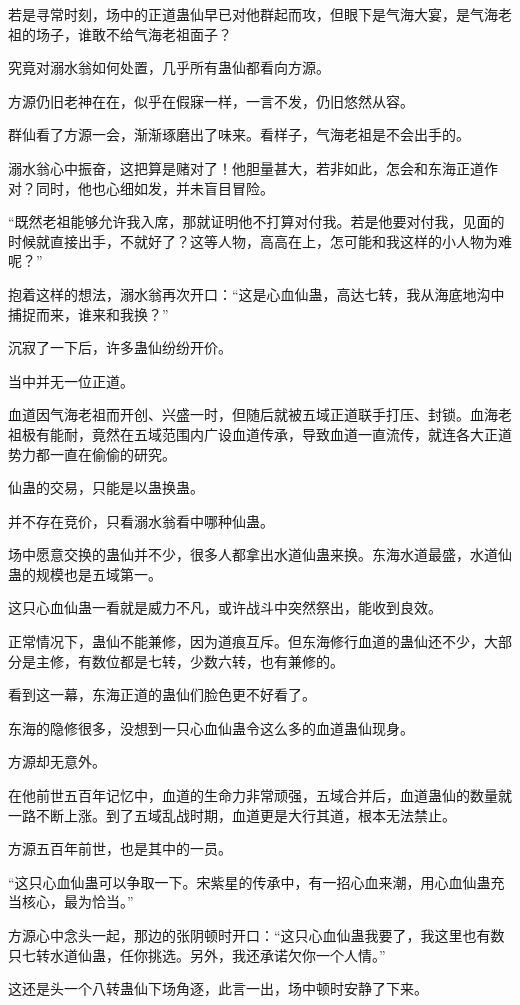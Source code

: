 \begin{this_body}
若是寻常时刻，场中的正道蛊仙早已对他群起而攻，但眼下是气海大宴，是气海老祖的场子，谁敢不给气海老祖面子？

究竟对溺水翁如何处置，几乎所有蛊仙都看向方源。

方源仍旧老神在在，似乎在假寐一样，一言不发，仍旧悠然从容。

群仙看了方源一会，渐渐琢磨出了味来。看样子，气海老祖是不会出手的。

溺水翁心中振奋，这把算是赌对了！他胆量甚大，若非如此，怎会和东海正道作对？同时，他也心细如发，并未盲目冒险。

“既然老祖能够允许我入席，那就证明他不打算对付我。若是他要对付我，见面的时候就直接出手，不就好了？这等人物，高高在上，怎可能和我这样的小人物为难呢？”

抱着这样的想法，溺水翁再次开口：“这是心血仙蛊，高达七转，我从海底地沟中捕捉而来，谁来和我换？”

沉寂了一下后，许多蛊仙纷纷开价。

当中并无一位正道。

血道因气海老祖而开创、兴盛一时，但随后就被五域正道联手打压、封锁。血海老祖极有能耐，竟然在五域范围内广设血道传承，导致血道一直流传，就连各大正道势力都一直在偷偷的研究。

仙蛊的交易，只能是以蛊换蛊。

并不存在竞价，只看溺水翁看中哪种仙蛊。

场中愿意交换的蛊仙并不少，很多人都拿出水道仙蛊来换。东海水道最盛，水道仙蛊的规模也是五域第一。

这只心血仙蛊一看就是威力不凡，或许战斗中突然祭出，能收到良效。

正常情况下，蛊仙不能兼修，因为道痕互斥。但东海修行血道的蛊仙还不少，大部分是主修，有数位都是七转，少数六转，也有兼修的。

看到这一幕，东海正道的蛊仙们脸色更不好看了。

东海的隐修很多，没想到一只心血仙蛊令这么多的血道蛊仙现身。

方源却无意外。

在他前世五百年记忆中，血道的生命力非常顽强，五域合并后，血道蛊仙的数量就一路不断上涨。到了五域乱战时期，血道更是大行其道，根本无法禁止。

方源五百年前世，也是其中的一员。

“这只心血仙蛊可以争取一下。宋紫星的传承中，有一招心血来潮，用心血仙蛊充当核心，最为恰当。”

方源心中念头一起，那边的张阴顿时开口：“这只心血仙蛊我要了，我这里也有数只七转水道仙蛊，任你挑选。另外，我还承诺欠你一个人情。”

这还是头一个八转蛊仙下场角逐，此言一出，场中顿时安静了下来。

\end{this_body}

